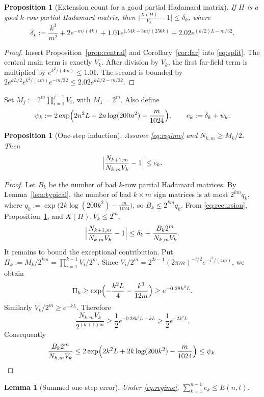 \documentclass[11pt,reqno]{amsart}
\theoremstyle{plain}
\newtheorem{lemma}[theorem]{Lemma}
\newtheorem{proposition}[theorem]{Proposition}
\theoremstyle{definition}
\theoremstyle{remark}
\begin{document}
\begin{proposition}[Extension count for a good partial Hadamard matrix]
\label{prop:extension}
If \(H\) is a good \(k\)-row partial Hadamard matrix, then
\(\bigl|\tfrac{X(H)}{V_k}-1\bigr|\le\delta_k\), where
\[
  \delta_k:=\frac{k^3}{m^2}+2e^{-m/(4k)}
    +1.01e^{1.54k-3m/(256k)}+2.02e^{(k/2)L-m/32}.
\]
\end{proposition}

\begin{proof}
Insert Proposition~\ref{prop:central} and Corollary~\ref{cor:far} into
\eqref{eq:split}. The central main term is exactly \(V_k\). After division by
\(V_k\), the first far-field term is multiplied by \(e^{k^2/(4m)}\le1.01\). The
second is bounded by
\(2e^{kL/2}e^{k^2/(4m)}e^{-m/32}\le2.02e^{kL/2-m/32}\).
\end{proof}

Set \(M_j:=2^m\prod_{i=1}^{j-1}V_i\), with \(M_1=2^m\). Also define
\[
  \psi_k:=2\exp\Bigl(2n^2L+2n\log(200n^2)-\frac m{1024}\Bigr),\qquad
  e_k:=\delta_k+\psi_k.
\]

\begin{proposition}[One-step induction]\label{prop:onestep}
Assume \eqref{eq:regime} and \(N_{k,m}\ge M_k/2\). Then
\[
  \Bigl|\frac{N_{k+1,m}}{N_{k,m}V_k}-1\Bigr|\le e_k.
\]
\end{proposition}

\begin{proof}
Let \(B_k\) be the number of bad \(k\)-row partial Hadamard matrices. By
Lemma~\ref{lem:typical}, the number of bad \(k\times m\) sign matrices is at
most \(2^{km}q_k\), where
\(q_k:=\exp\bigl(2k\log(200k^2)-\tfrac m{1024}\bigr)\), so
\(B_k\le2^{km}q_k\). From \eqref{eq:recursion},
Proposition~\ref{prop:extension}, and \(X(H),V_k\le2^m\),
\[
  \Bigl|\frac{N_{k+1,m}}{N_{k,m}V_k}-1\Bigr|
  \le\delta_k+\frac{B_k2^m}{N_{k,m}V_k}.
\]
It remains to bound the exceptional contribution. Put
\(\Pi_k:=M_k/2^{km}=\prod_{i=1}^{k-1}V_i/2^m\). Since
\(V_i/2^m=2^{2i-1}(2\pi m)^{-i/2}e^{-i^2/(4m)}\), we obtain
\[
  \Pi_k\ge\exp\Bigl(-\frac{k^2L}4-\frac{k^3}{12m}\Bigr)\ge e^{-0.28k^2L}.
\]
Similarly \(V_k/2^m\ge e^{-kL}\). Therefore
\[
  \frac{N_{k,m}V_k}{2^{(k+1)m}}\ge\frac12e^{-0.28k^2L-kL}
  \ge\frac12e^{-2k^2L}.
\]
Consequently
\[
  \frac{B_k2^m}{N_{k,m}V_k}
  \le2\exp\Bigl(2k^2L+2k\log(200k^2)-\frac m{1024}\Bigr)\le\psi_k. \qedhere
\]
\end{proof}

\begin{lemma}[Summed one-step error]\label{lem:summed}
Under \eqref{eq:regime}, \(\sum_{k=1}^{n-1}e_k\le E(n,t)\).
\end{lemma}
\end{document}
